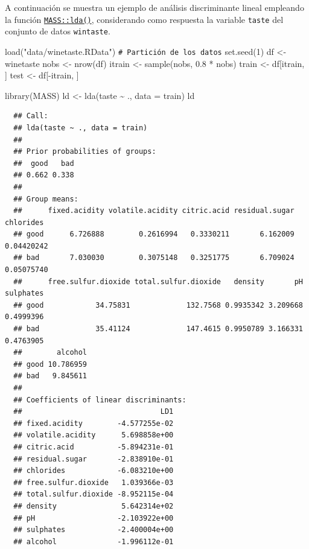 \documentclass[
]{book}
\newenvironment{Shaded}{\begin{snugshade}}{\end{snugshade}}
\newcommand{\AttributeTok}[1]{\textcolor[rgb]{0.77,0.63,0.00}{#1}}
\newcommand{\CommentTok}[1]{\textcolor[rgb]{0.56,0.35,0.01}{\textit{#1}}}
\newcommand{\DecValTok}[1]{\textcolor[rgb]{0.00,0.00,0.81}{#1}}
\newcommand{\FloatTok}[1]{\textcolor[rgb]{0.00,0.00,0.81}{#1}}
\newcommand{\FunctionTok}[1]{\textcolor[rgb]{0.00,0.00,0.00}{#1}}
\newcommand{\NormalTok}[1]{#1}
\newcommand{\OtherTok}[1]{\textcolor[rgb]{0.56,0.35,0.01}{#1}}
\newcommand{\SpecialCharTok}[1]{\textcolor[rgb]{0.00,0.00,0.00}{#1}}
\newcommand{\StringTok}[1]{\textcolor[rgb]{0.31,0.60,0.02}{#1}}
\theoremstyle{break}
\theoremstyle{nonumberplain}
\renewcommand{\CommentTok}[1]{\textcolor[rgb]{0.41,0.41,0.41}{\texttt{#1}}}
\begin{document}
A continuación se muestra un ejemplo de análisis discriminante lineal empleando la función \href{https://rdrr.io/pkg/MASS/man/lda.html}{\texttt{MASS::lda()}}, considerando como respuesta la variable \texttt{taste} del conjunto de datos \texttt{wintaste}.

\begin{Shaded}
\begin{Highlighting}[]
\FunctionTok{load}\NormalTok{(}\StringTok{"data/winetaste.RData"}\NormalTok{)}
\CommentTok{\# Partición de los datos}
\FunctionTok{set.seed}\NormalTok{(}\DecValTok{1}\NormalTok{)}
\NormalTok{df }\OtherTok{\textless{}{-}}\NormalTok{ winetaste}
\NormalTok{nobs }\OtherTok{\textless{}{-}} \FunctionTok{nrow}\NormalTok{(df)}
\NormalTok{itrain }\OtherTok{\textless{}{-}} \FunctionTok{sample}\NormalTok{(nobs, }\FloatTok{0.8} \SpecialCharTok{*}\NormalTok{ nobs)}
\NormalTok{train }\OtherTok{\textless{}{-}}\NormalTok{ df[itrain, ]}
\NormalTok{test }\OtherTok{\textless{}{-}}\NormalTok{ df[}\SpecialCharTok{{-}}\NormalTok{itrain, ]}

\FunctionTok{library}\NormalTok{(MASS)}
\NormalTok{ld }\OtherTok{\textless{}{-}} \FunctionTok{lda}\NormalTok{(taste }\SpecialCharTok{\textasciitilde{}}\NormalTok{ ., }\AttributeTok{data =}\NormalTok{ train)}
\NormalTok{ld}
\end{Highlighting}
\end{Shaded}

\begin{verbatim}
  ## Call:
  ## lda(taste ~ ., data = train)
  ## 
  ## Prior probabilities of groups:
  ##  good   bad 
  ## 0.662 0.338 
  ## 
  ## Group means:
  ##      fixed.acidity volatile.acidity citric.acid residual.sugar  chlorides
  ## good      6.726888        0.2616994   0.3330211       6.162009 0.04420242
  ## bad       7.030030        0.3075148   0.3251775       6.709024 0.05075740
  ##      free.sulfur.dioxide total.sulfur.dioxide   density       pH sulphates
  ## good            34.75831             132.7568 0.9935342 3.209668 0.4999396
  ## bad             35.41124             147.4615 0.9950789 3.166331 0.4763905
  ##        alcohol
  ## good 10.786959
  ## bad   9.845611
  ## 
  ## Coefficients of linear discriminants:
  ##                                LD1
  ## fixed.acidity        -4.577255e-02
  ## volatile.acidity      5.698858e+00
  ## citric.acid          -5.894231e-01
  ## residual.sugar       -2.838910e-01
  ## chlorides            -6.083210e+00
  ## free.sulfur.dioxide   1.039366e-03
  ## total.sulfur.dioxide -8.952115e-04
  ## density               5.642314e+02
  ## pH                   -2.103922e+00
  ## sulphates            -2.400004e+00
  ## alcohol              -1.996112e-01
\end{verbatim}
\end{document}
